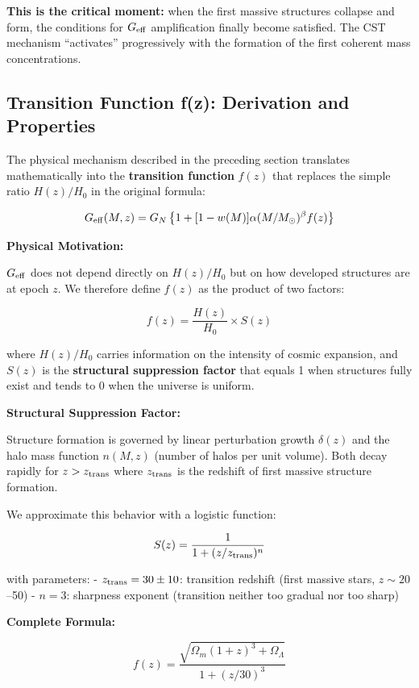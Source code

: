 \documentclass[10pt,a4paper]{article}
\begin{document}
\textbf{This is the critical moment:} when the first massive structures
collapse and form, the conditions for \(G_{\rm eff}\) amplification
finally become satisfied. The CST mechanism ``activates'' progressively
with the formation of the first coherent mass concentrations.

\subsection{Transition Function f(z): Derivation and
Properties}\label{transition-function-fz-derivation-and-properties}

The physical mechanism described in the preceding section translates
mathematically into the \textbf{transition function} \(f(z)\) that
replaces the simple ratio \(H(z)/H_0\) in the original formula:

\[G_{\rm eff}(M,z) = G_N \left\{1 + [1-w(M)] \alpha (M/M_\odot)^\beta f(z)\right\}\]

\textbf{Physical Motivation:}

\(G_{\rm eff}\) does not depend directly on \(H(z)/H_0\) but on how
developed structures are at epoch \(z\). We therefore define \(f(z)\) as
the product of two factors:

\[f(z) = \frac{H(z)}{H_0} \times S(z)\]

where \(H(z)/H_0\) carries information on the intensity of cosmic
expansion, and \(S(z)\) is the \textbf{structural suppression factor}
that equals 1 when structures fully exist and tends to 0 when the
universe is uniform.

\textbf{Structural Suppression Factor:}

Structure formation is governed by linear perturbation growth
\(\delta(z)\) and the halo mass function \(n(M,z)\) (number of halos per
unit volume). Both decay rapidly for \(z > z_{\rm trans}\) where
\(z_{\rm trans}\) is the redshift of first massive structure formation.

We approximate this behavior with a logistic function:

\[S(z) = \frac{1}{1 + (z/z_{\rm trans})^n}\]

with parameters: - \(z_{\rm trans} = 30 \pm 10\): transition redshift
(first massive stars, \(z \sim 20\)--50) - \(n = 3\): sharpness exponent
(transition neither too gradual nor too sharp)

\textbf{Complete Formula:}

\[\boxed{f(z) = \frac{\sqrt{\Omega_m(1+z)^3 + \Omega_\Lambda}}{1 + (z/30)^3}}\]
\end{document}
